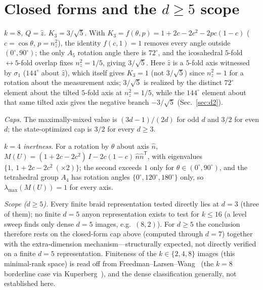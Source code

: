 \documentclass[aps,prx,reprint,amsmath,amssymb,floatfix,nofootinbib,superscriptaddress]{revtex4-2}
\begin{document}
\section{Closed forms and the $d \ge 5$ scope}
\label{app:closed}

\emph{$k=8$, $Q=\hat z$.} $K_3 = 3/\sqrt5$. With
$K_3 = f(\theta,p) = 1 + 2c - 2c^2 - 2pc(1-c)$ ($c = \cos\theta$, $p = n_z^2$), the
identity $f(c,1) = 1$ removes every angle outside $(0^\circ, 90^\circ)$; the only
$A_5$ rotation angle there is $72^\circ$, and the icosahedral
$5$-fold $\leftrightarrow 5$-fold overlap fixes $n_z^2 = 1/5$, giving $3/\sqrt5$.
Here $\hat z$ is a $5$-fold axis witnessed by $\sigma_1$ ($144^\circ$ about
$\hat z$), which itself gives $K_3=1$ (not $3/\sqrt5$) since $n_z^2=1$ for a
rotation about the measurement axis; $3/\sqrt5$ is realized by the distinct
$72^\circ$ element about the tilted $5$-fold axis at $n_z^2=1/5$, while the
$144^\circ$ element about that same tilted axis gives the negative branch
$-3/\sqrt5$ (Sec.~\ref{sec:d2}).

\emph{Caps.} The maximally-mixed value is $(3d-1)/(2d)$ for odd $d$ and $3/2$ for even
$d$; the state-optimized cap is $3/2$ for every $d \ge 3$.

\emph{$k=4$ inertness.} For a rotation by $\theta$ about axis $\hat n$,
$M(U) = (1 + 2c - 2c^2)\,I - 2c(1-c)\,\hat n \hat n^{\mathsf T}$, with
eigenvalues $\{1,\ 1 + 2c - 2c^2\ (\times 2)\}$; the second exceeds $1$ only for
$\theta \in (0^\circ, 90^\circ)$, and the tetrahedral group $A_4$ has rotation angles
$\{0^\circ, 120^\circ, 180^\circ\}$ only, so $\lambda_{\max}(M(U)) = 1$ for every
axis.

\emph{Scope ($d \ge 5$).} Every finite braid representation tested directly lies at
$d=3$ (three of them); no finite $d=5$ anyon representation exists to test for
$k \le 16$ (a level sweep finds only dense $d=5$ images, e.g.\ $(8,2)$). For
$d \ge 5$ the conclusion therefore rests on the closed-form cap above (computed
through $d=7$) together with the extra-dimension mechanism---structurally
expected, not directly verified on a finite $d=5$ representation. Finiteness of the $k \in \{2,4,8\}$ images (this minimal-rank space) is read off
from Freedman--Larsen--Wang~\cite{FLW} (the $k=8$ borderline case via
Kuperberg~\cite{Kup}), and the dense classification generally, not established
here.
\end{document}
